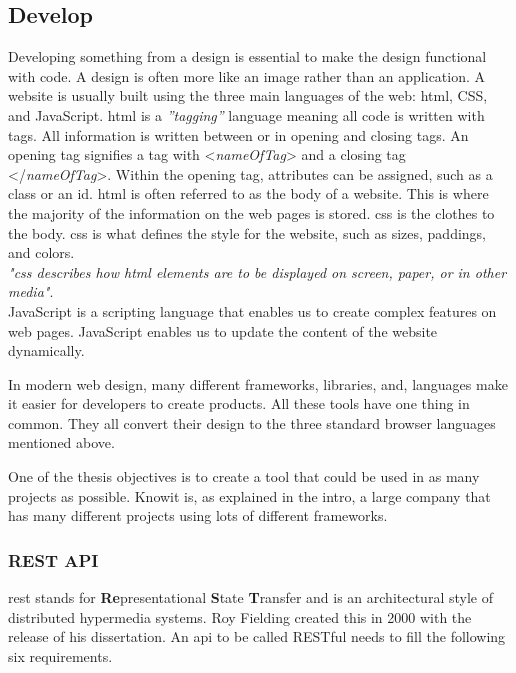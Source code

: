 \subsection{Develop}%
\label{sub:Develop}

Developing something from a design is essential to make the design functional with code. A design is often more like an image rather than an application. A website is usually built using the three main languages of the web: \acrfull{html}, CSS, and JavaScript. \acrshort{html} is a \textit{''tagging''} language meaning all code is written with tags. All information is written between or in opening and closing tags. An opening tag signifies a tag with  <\textit{nameOfTag}> and a closing tag </\textit{nameOfTag}>. Within the opening tag, attributes can be assigned, such as a class or an id. 
\acrshort{html} is often referred to as the body of a website. This is where the majority of the information on the web pages is stored. \acrshort{css} is the clothes to the body. \acrshort{css} is what defines the style for the website, such as sizes, paddings, and colors.\\
\textit{"\acrshort{css} describes how \acrshort{html} elements are to be displayed on screen, paper, or in other media"}\cite{CSSIntroduction}.\\
JavaScript is a scripting language that enables us to create complex features on web pages. JavaScript enables us to update the content of the website dynamically. 

In modern web design, many different frameworks, libraries, and, languages make it easier for developers to create products.  All these tools have one thing in common. They all convert their design to the three standard browser languages mentioned above. 

One of the thesis objectives is to create a tool that could be used in as many projects as possible. Knowit is, as explained in the intro, a large company that has many different projects using lots of different frameworks. 


\subsubsection{REST API}%
\label{sub:REST API}
\gls{rest} stands for \textbf{Re}presentational \textbf{S}tate \textbf{T}ransfer and is an architectural style of distributed hypermedia systems. Roy Fielding created this in 2000 with the release of his dissertation\cite{fieldingFieldingDissertationCHAPTER}. An \acrshort{api} to be called RESTful needs to fill the following six requirements\cite{fieldingFieldingDissertationCHAPTER,restfulapi.netWhatREST}. 

